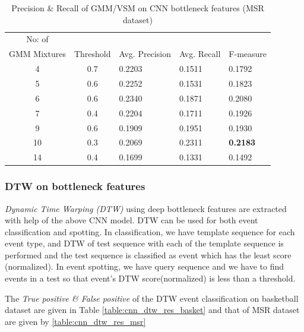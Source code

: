 \begin{table}[h]
\caption[Event spotting using GMM/VSM on CNN(Gray,Frame diff,Edge) bottleneck features (MSR Action Dataset) ]{ Precision \& Recall  of GMM/VSM on CNN bottleneck features (MSR dataset)}
\label{table:cnn_gmm_res_msr}
\centering
\begin{tabular}{|c|c|l|l|l|}
\hline
No: of &&&&\\
GMM Mixtures & Threshold & Avg. Precision & Avg. Recall & F-measure\\
\hline
\hline
 4 	&0.7 	&0.2203 	& 0.1511	&0.1792\\
 5 	&0.6 	&0.2252 	& 0.1531	&0.1823\\
 6 	&0.6 	&0.2340 	& 0.1871	&0.2080\\
 7 	&0.4 	&0.2204 	& 0.1711	&0.1926\\
 9 	&0.6 	&0.1909 	& 0.1951	&0.1930\\
10 	&0.3 	&0.2069 	& 0.2311	&\textbf{0.2183}\\
14 	&0.4 	&0.1699 	& 0.1331	&0.1492\\
\hline  
\end{tabular}
\end{table} 


\subsubsection{DTW on bottleneck features}
\textit{Dynamic Time Warping (DTW)} using deep bottleneck features are extracted with help of the above CNN model.  DTW can be used for both event classification and spotting.  In classification, we have template sequence for each event type, and DTW of test sequence with each of the template sequence is performed and the test sequence is classified as event which has the least score (normalized).  In event spotting, we have query sequence and we have to find events in a test so that event's DTW score(normalized) is less than a threshold.


The \textit{True positive \& False positive} of the DTW event classification on basketball dataset are given in Table \ref{table:cnn_dtw_res_basket} and that of MSR dataset are given by \ref{table:cnn_dtw_res_msr}

